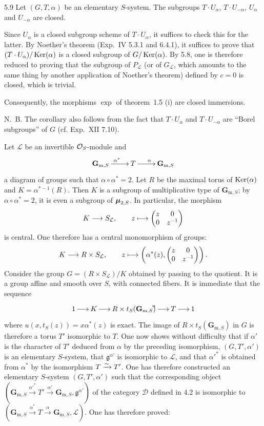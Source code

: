 \begin{corollary}{5.9}\label{XX.5.9}
Let $(G,T,\alpha)$ be an elementary $S$-system. The subgroups $T\cdot U_\alpha$, $T\cdot U_{-\alpha}$, $U_\alpha$ and $U_{-\alpha}$ are closed.
\end{corollary}
Since $U_\alpha$ is a closed subgroup scheme of $T\cdot U_\alpha$, it suffices to check this for the latter. By Noether's theorem (Exp.~IV 5.3.1 and 6.4.1), it suffices to prove that $(T\cdot U_\alpha)/\operatorname{Ker}(\alpha)$ is a closed subgroup of $G/\operatorname{Ker}(\alpha)$. By 5.8, one is therefore reduced to proving that the subgroup of $P_{\mathcal L}$ (or of $G_{\mathcal L}$, which amounts to the same thing by another application of Noether's theorem) defined by $c=0$ is closed, which is trivial.

Consequently, the morphisms $\exp$ of theorem~1.5 (i) are closed immersions.

N.~B. The corollary also follows from the fact that $T\cdot U_\alpha$ and $T\cdot U_{-\alpha}$ are ``Borel subgroups'' of $G$ (cf. Exp.~XII 7.10).

 Let $\mathcal L$ be an invertible $\mathcal{O}_S$-module and
\[
\xymatrix{\mathbf G_{\mathrm m,S}\ar[r]^{\alpha^*}&T\ar[r]^\alpha&\mathbf G_{\mathrm m,S}}
\]
a diagram of groups{\renewcommand{\thefootnote}{(35)}} such that $\alpha\circ\alpha^*=2$. Let $R$ be the maximal torus of $\operatorname{Ker}(\alpha)$ and $K=\alpha^{*-1}(R)$. Then $K$ is a subgroup of multiplicative type of $\mathbf G_{\mathrm m,S}$; by $\alpha\circ\alpha^*=2$, it is even a subgroup of $\boldsymbol{\mu}_{2,S}$. In particular, the morphism
\[
K\longrightarrow S_{\mathcal L},\qquad z\longmapsto\begin{pmatrix}z&0\\0&z^{-1}\end{pmatrix}
\]
is central. One therefore has a central monomorphism of groups:
\[
K\longrightarrow R\times S_{\mathcal L},\qquad z\longmapsto\left(\alpha^*(z),\begin{pmatrix}z&0\\0&z^{-1}\end{pmatrix}\right).
\]
Consider the group $G=(R\times S_{\mathcal L})/K$ obtained by passing to the quotient. It is a group affine and smooth over $S$, with connected fibers. It is immediate that the sequence
\[
\xymatrix@C=1.5em{1\ar[r]&K\ar[r]&R\times t_S(\mathbf G_{\mathrm m,S})\ar[r]^u&T\ar[r]&1}
\]
where $u(x,t_S(z))=x\alpha^*(z)$ is exact. The image of $R\times t_S(\mathbf G_{\mathrm m,S})$ in $G$ is therefore a torus $T'$ isomorphic to $T$. One now shows without difficulty that if $\alpha'$ is the character of $T'$ deduced from $\alpha$ by the preceding isomorphism, $(G,T',\alpha')$ is an elementary $S$-system, that $\mathfrak g^{\alpha'}$ is isomorphic to $\mathcal L$, and that $\alpha'^*$ is obtained from $\alpha^*$ by the isomorphism $T\xrightarrow{\sim} T'$. One has therefore constructed an elementary $S$-system $(G,T',\alpha')$ such that the corresponding object $(\mathbf G_{\mathrm m,S}\xrightarrow{\alpha'^*}T'\xrightarrow{\alpha'}\mathbf G_{\mathrm m,S},\mathfrak g^{\alpha'})$ of the category $\mathcal D$ defined in 4.2 is isomorphic to $(\mathbf G_{\mathrm m,S}\xrightarrow{\alpha^*}T\xrightarrow\alpha\mathbf G_{\mathrm m,S},\mathcal L)$. One has therefore proved:

